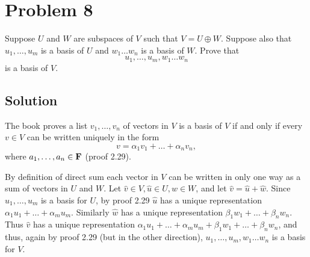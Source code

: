 \documentclass{article}
\begin{document}
\section*{Problem 8}
Suppose $U$ and $W$ are subspaces of $V$ such that $V=U\oplus W$. Suppose also that $u_1,\ldots,u_m$ is a basis of $U$ and $w_1\ldots w_n$ is a basis of $W$. Prove that
\[u_1,\ldots,u_m, w_1\ldots w_n\]
is a basis of $V$.

\subsection*{Solution}
The book proves a list $v_1,\ldots,v_n$ of vectors in $V$ is a basis of $V$ if and only if every $v\in V$ can be written uniquely in the form
\[v=\alpha_1 v_1+\ldots+\alpha_n v_n,\]
where $a_1,\ldots,a_n\in\mathbf{F}$ (proof 2.29).

\vs

By definition of direct sum each vector in $V$ can be written in only one way as a sum of vectors in $U$ and $W$. Let $\hat{v}\in V, \hat{u}\in U, \hat{w}\in W$, and let $\hat{v}=\hat{u}+\hat{w}$. Since $u_1,\ldots,u_m$ is a basis for $U$, by proof 2.29 $\hat{u}$ has a unique representation $\alpha_1 u_1+\ldots+\alpha_m u_m$. Similarly $\hat{w}$ has a unique representation $\beta_1 w_1+\ldots+\beta_n w_n$. Thus $\hat{v}$ has a unique representation $\alpha_1 u_1+\ldots+\alpha_m u_m+\beta_1 w_1+\ldots+\beta_n w_n$, and thus, again by proof 2.29 (but in the other direction), $u_1,\ldots,u_m, w_1\ldots w_n$ is a basis for $V$.
\end{document}
